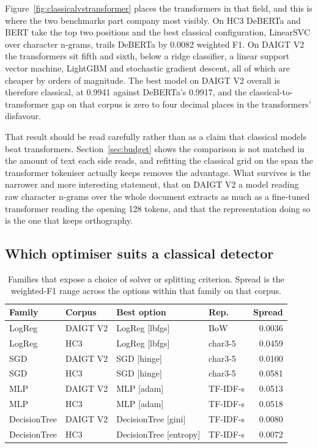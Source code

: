 \documentclass[conference,a4paper]{IEEEtran}
\begin{document}
Figure~\ref{fig:classicalvstransformer} places the transformers in that field, and this is where the two benchmarks part company most visibly. On HC3 DeBERTa and BERT take the top two positions and the best classical configuration, LinearSVC over character n-grams, trails DeBERTa by 0.0082 weighted F1. On DAIGT V2 the transformers sit fifth and sixth, below a ridge classifier, a linear support vector machine, LightGBM and stochastic gradient descent, all of which are cheaper by orders of magnitude. The best model on DAIGT V2 overall is therefore classical, at 0.9941 against DeBERTa's 0.9917, and the classical-to-transformer gap on that corpus is zero to four decimal places in the transformers' disfavour.

That result should be read carefully rather than as a claim that classical models beat transformers. Section~\ref{sec:budget} shows the comparison is not matched in the amount of text each side reads, and refitting the classical grid on the span the transformer tokeniser actually keeps removes the advantage. What survives is the narrower and more interesting statement, that on DAIGT V2 a model reading raw character n-grams over the whole document extracts as much as a fine-tuned transformer reading the opening 128 tokens, and that the representation doing so is the one that keeps orthography.

\subsection{Which optimiser suits a classical detector}
\label{sec:solvers}

\begin{table}[!ht]
\centering
\caption{Families that expose a choice of solver or splitting criterion. Spread is the weighted-F1 range across the options within that family on that corpus.}
\label{tab:solvers}
\footnotesize
\setlength{\tabcolsep}{3.5pt}
\begin{tabular}{@{}llllr@{}}
\toprule
Family & Corpus & Best option & Rep. & Spread \\
\midrule
LogReg & DAIGT V2 & LogReg [lbfgs] & BoW & 0.0036 \\
LogReg & HC3 & LogReg [lbfgs] & char3-5 & 0.0459 \\
SGD & DAIGT V2 & SGD [hinge] & char3-5 & 0.0100 \\
SGD & HC3 & SGD [hinge] & char3-5 & 0.0581 \\
MLP & DAIGT V2 & MLP [adam] & TF-IDF-s & 0.0513 \\
MLP & HC3 & MLP [adam] & TF-IDF-s & 0.0518 \\
DecisionTree & DAIGT V2 & DecisionTree [gini] & TF-IDF-s & 0.0080 \\
DecisionTree & HC3 & DecisionTree [entropy] & TF-IDF-s & 0.0072 \\
\bottomrule
\end{tabular}
\end{table}
\end{document}
